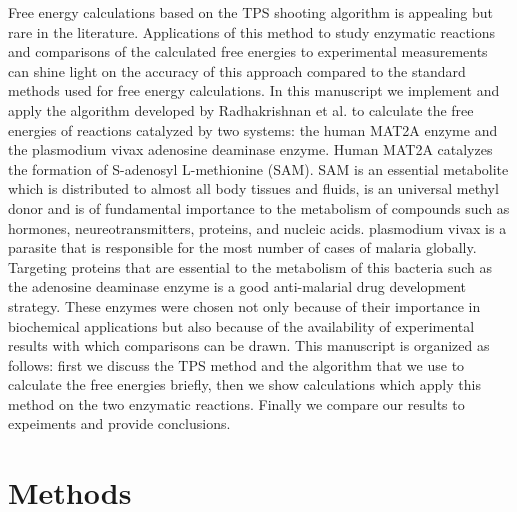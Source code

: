 \documentclass[journal=jpcbfk,manuscript=article,layout=traditional]{achemso}
\begin{document}
Free energy calculations based on the TPS shooting algorithm is 
appealing but rare in the literature. Applications of this 
method to study enzymatic reactions and comparisons of the calculated 
free energies to experimental measurements can shine light on the 
accuracy of this approach compared to the standard methods used for 
free energy calculations.    
In this manuscript we implement and apply the 
algorithm developed by Radhakrishnan et al. \cite{Radhakrishnan04JChemPhys121p2436} 
to calculate the free energies of reactions catalyzed by two systems:
the human MAT2A enzyme and the plasmodium vivax adenosine deaminase 
enzyme. \cite{Luo07JAmChemSoc129p8008,Ho09Biochemistry48p9618}
Human MAT2A catalyzes the formation of S-adenosyl L-methionine (SAM).
SAM is an essential metabolite which is 
distributed to almost all body tissues and fluids, is an universal 
methyl donor and is of fundamental importance to the metabolism of 
compounds such as hormones, neureotransmitters, proteins, 
and nucleic acids. \cite{Friedel89Drugs38p389}
plasmodium vivax is a parasite that is responsible for the most number 
of cases of malaria globally. Targeting proteins that are essential to
the metabolism of this bacteria such as the adenosine deaminase enzyme 
is a good anti-malarial drug development strategy. \cite{Madrid08JBiolChem283p35899} 
These enzymes were chosen not only because of their importance in 
biochemical applications but also because of the availability of experimental 
results with which comparisons can be drawn. This manuscript is organized as 
follows: first we discuss the TPS method and the algorithm that we use 
to calculate the free energies briefly, then we show calculations which apply this 
method on the two enzymatic reactions. Finally we compare our results to expeiments
and provide conclusions. 
\section{Methods}
\end{document}
